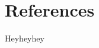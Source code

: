 \documentclass[../../dd.tex]{subfiles}
\begin{document}
	\chapter{References}

	Heyheyhey
\end{document}
